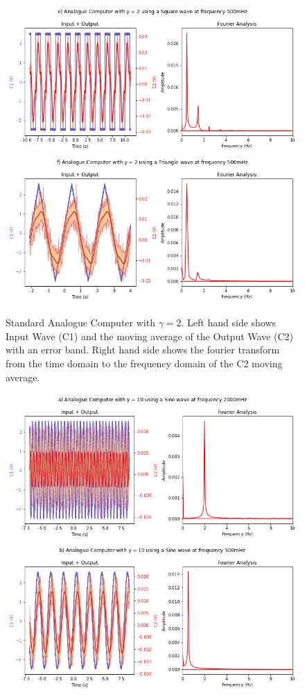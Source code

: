 \documentclass[journal]{Imperial_lab_report}
\begin{document}
\begin{appendices}
\begin{figure}
            \includegraphics[scale = 0.30]{G 2 S_500.png}
            \includegraphics[scale = 0.30]{G 2 T_500.png}
            \caption{Standard Analogue Computer with $\gamma = 2$. Left hand side shows Input Wave (C1) and the moving average of the Output Wave (C2) with an error band. Right hand side shows the fourier transform from the time domain to the frequency domain of the C2 moving average.}
        \end{figure}
        \begin{figure}
            \label{G 10 Graphs}
            \centering
            \includegraphics[scale = 0.30]{G 10 N_2000.png}
            \includegraphics[scale = 0.30]{G 10 N_500.png}

\end{figure}
\end{appendices}
\end{document}
